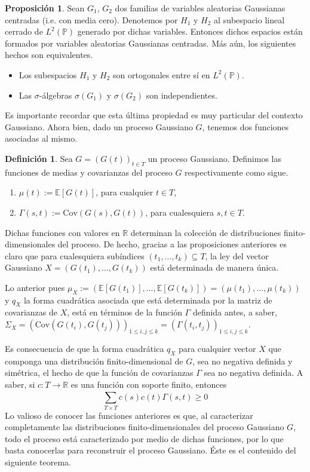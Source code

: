 \documentclass[letterpaper,twoside,12pt]{book}
\newcommand{\R}{\mathbb{R}}
\newcommand{\E}{\mathbb{E}}
\renewcommand{\P}{\mathbb{P}}
\newcommand{\1}{\mathds{1}}
\renewcommand{\to}{\rightarrow}
\theoremstyle{definition}
\newtheorem{dfn}{Definición}
\theoremstyle{definition}
\theoremstyle{remark}
\theoremstyle{definition}
\theoremstyle{definition}
\newtheorem{prop}{Proposición}
\theoremstyle{definition}
\theoremstyle{definition}
\theoremstyle{definition}
\begin{document}
\begin{prop}\label{Gaussi_indep} 
 Sean $G_1$, $G_2$ dos familias de variables aleatorias Gaussianas centradas (i.e. con media cero). Denotemos por $H_1$ y $H_2$ al subespacio lineal cerrado de $L^{2}(\P)$ generado por dichas variables. Entonces dichos espacios están formados por variables aleatorias Gaussianas centradas. Más aún, los siguientes hechos son equivalentes.
 \begin{itemize}
    \item Los subespacios $H_1$ y $H_2$ son ortogonales entre sí en $L^{2}(\P)$.
    \item Las $\sigma$-álgebras $\sigma(G_1)$ y $\sigma(G_2)$ son independientes.
 \end{itemize}
 \end{prop}
 Es importante recordar que esta última propiedad es muy particular del contexto Gaussiano. Ahora bien, dado un proceso Gaussiano $G$, tenemos dos funciones asociadas al mismo.
\begin{dfn} 
 Sea $G=(G(t))_{t\in T}$ un proceso Gaussiano. Definimos las funciones de medias y covarianzas del proceso $G$ respectivamente como sigue.
 \begin{enumerate}
    \item $\mu(t):=\E\left[G(t)\right]$, \qquad para cualquier $t\in T$,
    \item $\Gamma(s,t):= \text{Cov}\left(G(s),G(t)\right)$, \qquad para cualesquiera $s,t\in T$.
 \end{enumerate}
 \end{dfn}
Dichas funciones con valores en $\R$ determinan la colección de distribuciones finito-dimensionales del proceso. 
De hecho, gracias a las proposiciones anteriores es claro que para cualesquiera subíndices $(t_1,...,t_k)\subseteq T$, la ley del vector Gaussiano $X=(G(t_1),...,G(t_k))$ está determinada de manera única. 

Lo anterior pues $\mu_X:=(\E\left[G(t_1)\right],...,\E\left[G(t_k)\right])=(\mu(t_1),...,\mu(t_k))$ y $q_X$ la forma cuadrática asociada que está determinada por la matriz de covarianzas de $X$, está en términos de la función $\Gamma$ definida antes, a saber, $\Sigma_X=\left(\text{Cov}\left(G(t_i),G(t_j)\right)\right)_{1\leq i,j\le k}=\left(\Gamma(t_i,t_j)\right)_{1\le i,j\le k }$.

Es consecuencia de que la forma cuadrática $q_X$ para cualquier vector $X$ que componga una distribución finito-dimensional de $G$, sea no negativa definida y simétrica, el hecho de que la función de covarianzas $\Gamma$ sea no negativa definida. A saber, si $c:T\to \R$ es una función con soporte finito, entonces 
\[  
    \sum_{T\times T}^{}c(s)c(t)\Gamma(s,t)\geq0
\]
Lo valioso de conocer las funciones anteriores es que, al caracterizar completamente las distribuciones finito-dimensionales del proceso Gaussiano $G$, todo el proceso está caracterizado por medio de dichas funciones, por lo que basta conocerlas para reconstruir el proceso Gaussiano. Éste es el contenido del siguiente teorema.
\end{document}
